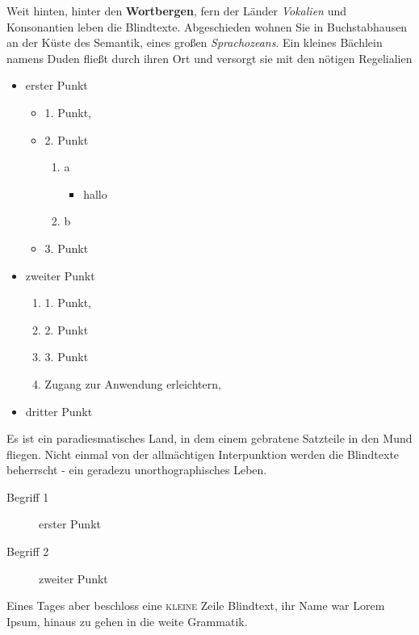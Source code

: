 \documentclass[%
	12pt,%
	a4paper,%
	oneside,%
	listof=totoc,
 	index=totoc,
	bibliography = totoc,
	parskip = half,%
	chapterprefix=false,%
	appendixprefix, %
	headings=small,%
]{scrreprt}
\begin{document}
Weit hinten, hinter den \textbf{Wortbergen}, fern der Länder \textit{Vokalien} und Konsonantien leben die Blindtexte. Abgeschieden wohnen Sie in Buchstabhausen an der Küste des Semantik, eines großen \textsl{Sprachozeans}. Ein kleines Bächlein namens Duden fließt durch ihren Ort und versorgt sie mit den nötigen Regelialien %

\begin{itemize}
	\item erster Punkt
	\begin{itemize}
		\item 1. Punkt,
		\item 2. Punkt
		\begin{enumerate}
			\item a
			\begin{itemize}
				\item hallo
			\end{itemize}
						\item b
		\end{enumerate}
		\item 3. Punkt
	\end{itemize}
	\item zweiter Punkt
	\begin{enumerate}
		\item 1. Punkt,
		\item 2. Punkt
		\item 3. Punkt
		\item Zugang zur Anwendung erleichtern,
	\end{enumerate}
	\item dritter Punkt
\end{itemize}

Es ist ein paradiesmatisches Land, in dem einem gebratene Satzteile in den Mund fliegen. Nicht einmal von der allmächtigen Interpunktion werden die Blindtexte beherrscht - ein geradezu unorthographisches Leben.

\begin{description}
	\item[Begrif\/f 1] erster Punkt
	\item[Begrif\/f 2] zweiter Punkt
\end{description}

Eines Tages aber beschloss eine \textsc{kleine} Zeile Blindtext, ihr Name war Lorem Ipsum, hinaus zu gehen in die weite Grammatik.

\end{document}
